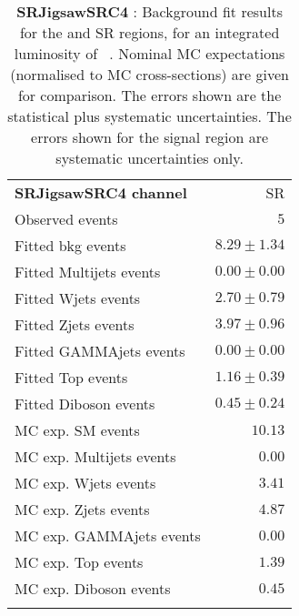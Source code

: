 

\begin{table}
\begin{center}
\setlength{\tabcolsep}{0.0pc}
{\tiny
\begin{tabular*}{\textwidth}{@{\extracolsep{\fill}}lr}
\noalign{\smallskip}\hline\noalign{\smallskip}
{\bf SRJigsawSRC4 channel}           & SR              \\[-0.05cm]
\noalign{\smallskip}\hline\noalign{\smallskip}
Observed events          & $5$                    \\
\noalign{\smallskip}\hline\noalign{\smallskip}
Fitted bkg events         & $8.29 \pm 1.34$              \\
\noalign{\smallskip}\hline\noalign{\smallskip}
        Fitted Multijets events         & $0.00 \pm 0.00$              \\
        Fitted Wjets events         & $2.70 \pm 0.79$              \\
        Fitted Zjets events         & $3.97 \pm 0.96$              \\
        Fitted GAMMAjets events         & $0.00 \pm 0.00$              \\
        Fitted Top events         & $1.16 \pm 0.39$              \\
        Fitted Diboson events         & $0.45 \pm 0.24$              \\
 \noalign{\smallskip}\hline\noalign{\smallskip}
MC exp. SM events              & $10.13$              \\
\noalign{\smallskip}\hline\noalign{\smallskip}
        MC exp. Multijets events         & $0.00$              \\
        MC exp. Wjets events         & $3.41$              \\
        MC exp. Zjets events         & $4.87$              \\
        MC exp. GAMMAjets events         & $0.00$              \\
        MC exp. Top events         & $1.39$              \\
        MC exp. Diboson events         & $0.45$              \\
\noalign{\smallskip}\hline\noalign{\smallskip}
\end{tabular*}
}
\end{center}
\caption{{\bf SRJigsawSRC4} : Background fit results for the  and SR regions, for an integrated luminosity of \ourintlumi~\ifb. Nominal MC expectations (normalised to MC cross-sections) are given for comparison. The errors shown are the statistical plus systematic uncertainties. The errors shown for the signal region are systematic uncertainties only.}
\label{table.results.systematics.in.logL.fit.SR.SRJigsawSRC4}
\end{table}
%